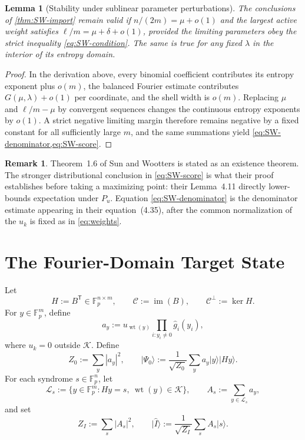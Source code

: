 \documentclass[11pt,letterpaper]{article}
\newtheorem{lemma}[theorem]{Lemma}
\theoremstyle{definition}
\newtheorem{remark}[theorem]{Remark}
\newcommand{\F}{\mathbb{F}}
\newcommand{\C}{\mathcal{C}}
\newcommand{\Kcal}{\mathcal{K}}
\newcommand{\Lcal}{\mathcal{L}}
\newcommand{\wt}{\operatorname{wt}}
\newcommand{\ket}[1]{\lvert #1\rangle}
\newcommand{\abs}[1]{\left\lvert #1\right\rvert}
\begin{document}
\begin{lemma}[Stability under sublinear parameter perturbations]
\label{lem:SW-stability}
The conclusions of \cref{thm:SW-import} remain valid if $n/(2m)=\mu+o(1)$ and the largest active weight satisfies $\ell/m=\mu+\delta+o(1)$, provided the limiting parameters obey the strict inequality \cref{eq:SW-condition}.  The same is true for any fixed $\lambda$ in the interior of its entropy domain.
\end{lemma}

\begin{proof}
In the derivation above, every binomial coefficient contributes its entropy exponent plus $o(m)$, the balanced Fourier estimate contributes $G(\mu,\lambda)+o(1)$ per coordinate, and the shell width is $o(m)$.  Replacing $\mu$ and $\ell/m-\mu$ by convergent sequences changes the continuous entropy exponents by $o(1)$.  A strict negative limiting margin therefore remains negative by a fixed constant for all sufficiently large $m$, and the same summations yield \cref{eq:SW-denominator,eq:SW-score}.
\end{proof}

\begin{remark}
Theorem~1.6 of Sun and Wootters is stated as an existence theorem.  The stronger distributional conclusion in \cref{eq:SW-score} is what their proof establishes before taking a maximizing point: their Lemma~4.11 directly lower-bounds expectation under $P_u$.  Equation \eqref{eq:SW-denominator} is the denominator estimate appearing in their equation~(4.35), after the common normalization of the $u_k$ is fixed as in \cref{eq:weights}.
\end{remark}

\section{The Fourier-Domain Target State}

Let
\begin{equation}
   H:=B^{\mathsf T}\in\F_p^{n\times m},
   \qquad \C:=\operatorname{im}(B),
   \qquad
   \C^\perp:=\ker H.
   \label{eq:H-code}
\end{equation}
For $y\in\F_p^m$, define
\begin{equation}
   a_y:=u_{\wt(y)}\prod_{i:y_i\ne0}\widehat g_i(y_i),
   \label{eq:ay}
\end{equation}
where $u_k=0$ outside $\Kcal$.  Define
\begin{equation}
   Z_0:=\sum_y\abs{a_y}^2,
   \qquad
   \ket{\Psi_0}:=\frac1{\sqrt{Z_0}}\sum_y a_y\ket{y}\ket{Hy}.
   \label{eq:labeled-state}
\end{equation}
For each syndrome $s\in\F_p^n$, let
\begin{equation}
   \Lcal_s:=\{y\in\F_p^m:Hy=s,\ \wt(y)\in\Kcal\},
   \qquad
   A_s:=\sum_{y\in\Lcal_s}a_y,
   \label{eq:fibers}
\end{equation}
and set
\begin{equation}
   Z_I:=\sum_s\abs{A_s}^2,
   \qquad
   \ket{\widehat I}:=\frac1{\sqrt{Z_I}}\sum_sA_s\ket{s}.
   \label{eq:ideal-syndrome}
\end{equation}
\end{document}
